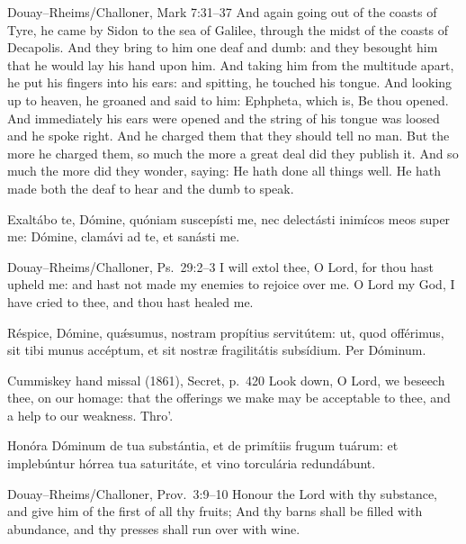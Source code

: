 \medskip\noindent{}
\finishfulltextelement
\begin{fulltextenglish}{Douay--Rheims/Challoner, Mark 7:31--37}
And again going out of the coasts of Tyre, he came by Sidon to the sea of
Galilee, through the midst of the coasts of Decapolis. And they bring to him
one deaf and dumb: and they besought him that he would lay his hand upon him.
And taking him from the multitude apart, he put his fingers into his ears:
and spitting, he touched his tongue. And looking up to heaven, he groaned and
said to him: Ephpheta, which is, Be thou opened. And immediately his ears
were opened and the string of his tongue was loosed and he spoke right. And
he charged them that they should tell no man. But the more he charged them,
so much the more a great deal did they publish it. And so much the more did
they wonder, saying: He hath done all things well. He hath made both the deaf
to hear and the dumb to speak.
\end{fulltextenglish}

Exaltábo te, Dómine, quóniam suscepísti me, nec delectásti inimícos meos
super me: Dómine, clamávi ad te, et sanásti me.
\finishfulltextelement
\begin{fulltextenglish}{Douay--Rheims/Challoner, Ps.~29:2--3}
I will extol thee, O Lord, for thou hast upheld me: and hast not made my
enemies to rejoice over me. O Lord my God, I have cried to thee, and thou
hast healed me.
\end{fulltextenglish}

Réspice, Dómine, quǽsumus, nostram propítius servitútem: ut, quod offérimus,
sit tibi munus accéptum, et sit nostræ fragilitátis subsídium. Per Dóminum.
\finishfulltextelement
\begin{fulltextenglish}{Cummiskey hand missal (1861), Secret, p.~420}
Look down, O Lord, we beseech thee, on our homage: that the offerings we make
may be acceptable to thee, and a help to our weakness. Thro'.
\end{fulltextenglish}

Honóra Dóminum de tua substántia, et de primítiis frugum tuárum: et
implebúntur hórrea tua saturitáte, et vino torculária redundábunt.
\finishfulltextelement
\begin{fulltextenglish}{Douay--Rheims/Challoner, Prov.~3:9--10}
Honour the Lord with thy substance, and give him of the first of all thy
fruits; And thy barns shall be filled with abundance, and thy presses shall
run over with wine.
\end{fulltextenglish}

